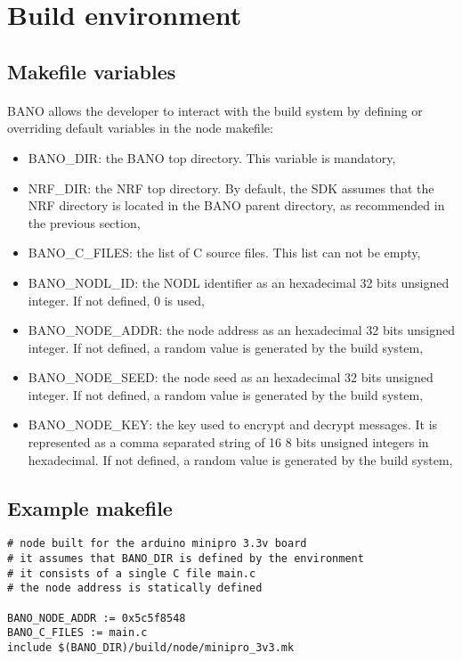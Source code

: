 \documentclass[a4paper, 11pt]{article}
\begin{document}
\clearpage
\section{Build environment}

\subsection{Makefile variables}
\paragraph{}
BANO allows the developer to interact with the build system by
defining or overriding default variables in the node makefile:
\begin{itemize}
\item BANO\_DIR: the BANO top directory. This variable is
mandatory,
\item NRF\_DIR: the NRF top directory. By default, the SDK
assumes that the NRF directory is located in the BANO parent
directory, as recommended in the previous section,
\item BANO\_C\_FILES: the list of C source files. This list
can not be empty,
\item BANO\_NODL\_ID: the NODL identifier as an hexadecimal
32 bits unsigned integer. If not defined, 0 is used,
\item BANO\_NODE\_ADDR: the node address as an hexadecimal 32
bits unsigned integer. If not defined, a random value is
generated by the build system,
\item BANO\_NODE\_SEED: the node seed as an hexadecimal 32
bits unsigned integer. If not defined, a random value is
generated by the build system,
\item BANO\_NODE\_KEY: the key used to encrypt and decrypt
messages. It is represented as a comma separated string of 16
8 bits unsigned integers in hexadecimal. If not defined, a
random value is generated by the build system,
\end{itemize}

\subsection{Example makefile}
\begin{scriptsize}
\begin{verbatim}
# node built for the arduino minipro 3.3v board
# it assumes that BANO_DIR is defined by the environment
# it consists of a single C file main.c
# the node address is statically defined

BANO_NODE_ADDR := 0x5c5f8548
BANO_C_FILES := main.c
include $(BANO_DIR)/build/node/minipro_3v3.mk
\end{verbatim}
\end{scriptsize}
\end{document}
